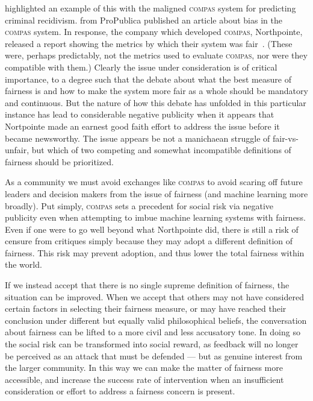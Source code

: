 \documentclass[11pt]{article}
\newcommand{\textcite}[1]{\citet{#1}}
\begin{document}
\textcite{Johndrow2017} highlighted an example of this with the maligned \textsc{compas} system for predicting criminal recidivism. \textcite{Angwin2016} from ProPublica published an article about bias in the \textsc{compas} system. In response, the company which developed \textsc{compas}, Northpointe, released a report showing the metrics by which their system was fair~\cite{Dieterich2016}.
(These were, perhaps predictably, not the metrics \citeauthor{Angwin2016} used to evaluate \textsc{compas}, nor were they compatible with them.)
Clearly the issue under consideration is of critical importance, to a degree such that the debate about what the best measure of fairness is and how to make the system more fair as a whole should be mandatory and continuous. But the nature of how this debate has unfolded in this particular instance has lead to considerable negative publicity when it appears that Nortpointe made an earnest good faith effort to address the issue before it became newsworthy.
The issue appears be not a manichaean struggle of fair-vs-unfair, but which of two competing and somewhat incompatible definitions of fairness should be prioritized.

As a community we must avoid exchanges like \textsc{compas} to avoid scaring off future leaders and decision makers from the issue of fairness (and machine learning more broadly). Put simply, \textsc{compas} sets a precedent for social risk via negative publicity even when attempting to imbue machine learning systems with fairness. Even if one were to go well beyond what Northpointe did, there is still a risk of censure from critiques simply because they may adopt a different definition of fairness. This risk may prevent adoption, and thus lower the total fairness within the world.


If we instead accept that there is no single supreme definition of fairness, the situation can be improved. When we accept that others may not have considered certain factors in selecting their fairness measure, or may have reached their conclusion under different but equally valid philosophical beliefs, the conversation about fairness can be lifted to a more civil and less accusatory tone. In doing so the social risk can be transformed into social reward, as feedback will no longer be perceived as an attack that must be defended --- but as genuine interest from the larger community. In this way we can make the matter of fairness more accessible, and increase the success rate of intervention when an insufficient consideration or effort to address a fairness concern is present. 
\end{document}
